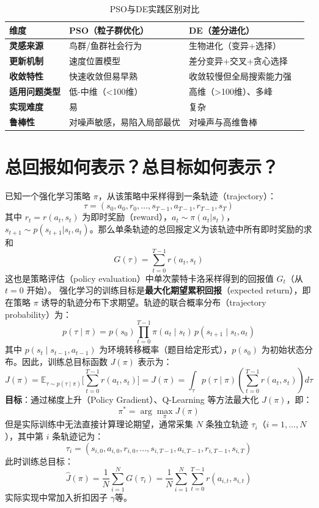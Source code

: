 \documentclass[12pt,a4paper,UTF8]{ctexart}
\begin{document}
\begin{table}[htbp]
\centering
\begin{tabular}{p{3cm}p{5cm}p{5cm}c}
\toprule
维度 & PSO（粒子群优化） & DE（差分进化） \\
\midrule
\textbf{灵感来源} & 鸟群/鱼群社会行为 & 生物进化（变异+选择）  \\
\textbf{更新机制} & 速度位置模型 & 差分变异+交叉+贪心选择  \\
\textbf{收敛特性} & 快速收敛但易早熟 & 收敛较慢但全局搜索能力强 \\
\textbf{适用问题类型} & 低-中维（<100维） & 高维（>100维）、多峰 \\
\textbf{实现难度} & 易& 复杂  \\
\textbf{鲁棒性} & 对噪声敏感，易陷入局部最优 & 对噪声与高维鲁棒  \\
\bottomrule
\end{tabular}
\caption{PSO与DE实践区别对比}
\end{table}

\section{总回报如何表示？总目标如何表示？}

已知一个强化学习策略 \(\pi\)，从该策略中采样得到一条轨迹（trajectory）：
\[
\tau = (s_0, a_0, r_0, \dots, s_{T-1}, a_{T-1}, r_{T-1}, s_T)
\]
其中 \( r_t = r(a_t, s_t) \) 为即时奖励（reward），\( a_t \sim \pi(a_t | s_t) \)，\( s_{t+1} \sim p(s_{t+1} | s_t, a_t) \)。那么单条轨迹的总回报定义为该轨迹中所有即时奖励的求和
\[
G(\tau) = \sum_{t=0}^{T-1} r(a_t, s_t)
\]
这也是策略评估（policy evaluation）中单次蒙特卡洛采样得到的回报值 \( G_t \)（从 \( t=0 \) 开始）。
强化学习的训练目标是\textbf{最大化期望累积回报}（expected return），即在策略 \(\pi\) 诱导的轨迹分布下求期望。轨迹的联合概率分布（trajectory probability）为：
\[
p(\tau \mid \pi) = p(s_0) \prod_{t=0}^{T-1} \pi(a_t \mid s_t) \, p(s_{t+1} \mid s_t, a_t)
\]
其中 \( p(s_t \mid s_{t-1}, a_{t-1}) \) 为环境转移概率（题目给定形式），\( p(s_0) \) 为初始状态分布。因此，训练总目标函数 \( J(\pi) \) 表示为：
\[
J(\pi) = \mathbb{E}_{\tau \sim p(\tau \mid \pi)} \Bigg[ \sum_{t=0}^{T-1} r(a_t, s_t) \Bigg]
=
J(\pi) = \int_{\tau} p(\tau \mid \pi) \left( \sum_{t=0}^{T-1} r(a_t, s_t) \right) d\tau
\]
\textbf{目标}：通过梯度上升（Policy Gradient）、Q-Learning 等方法最大化 \( J(\pi) \)，即：
\[
\pi^* = \arg\max_{\pi} J(\pi)
\]
但是实际训练中无法直接计算理论期望，通常采集 \( N \) 条独立轨迹 \(\tau_i\)（\( i=1,\dots,N \)），其中第 \( i \) 条轨迹记为：
\[
\tau_i = (s_{i,0}, a_{i,0}, r_{i,0}, \dots, s_{i,T-1}, a_{i,T-1}, r_{i,T-1}, s_{i,T})
\]
此时训练总目标：
\[
\hat{J}(\pi) = \frac{1}{N} \sum_{i=1}^{N} G(\tau_i) = \frac{1}{N} \sum_{i=1}^{N} \sum_{t=0}^{T-1} r(a_{i,t}, s_{i,t})
\]
实际实现中常加入折扣因子 \(\gamma\)等。
\end{document}
